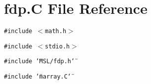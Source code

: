 \section{fdp.C File Reference}
\label{fdp_8C}
{\tt \#include $<$math.h$>$}\par
{\tt \#include $<$stdio.h$>$}\par
{\tt \#include \char`\"{}MSL/fdp.h\char`\"{}}\par
{\tt \#include \char`\"{}marray.C\char`\"{}}\par
